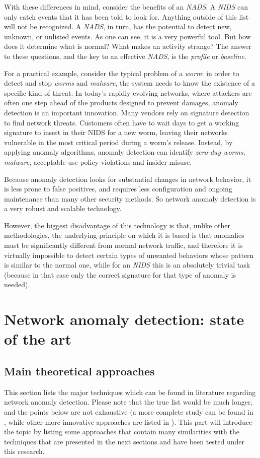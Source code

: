 \documentclass[12pt,a4paper,cucitura]{toptesi}
\begin{document}
With these differences in mind, consider the benefits of an \emph{NADS}.
A \emph{NIDS} can only catch events that it has been told to look for.
Anything outside of this list will not be recognized. A \emph{NADS}, in turn, has the potential to detect new, unknown, or unlisted events.
As one can see, it is a very powerful tool.
But how does it determine what is normal? What makes an activity strange? The answer to these questions, and the key to an effective \emph{NADS}, is the \emph{profile} or \emph{baseline}.

For a practical example, consider the typical problem of a \emph{worm}: in order to detect and stop \emph{worms} and \emph{malware}, the system needs to know the existence of a specific kind of threat.
In today's rapidly evolving networks, where attackers are often one step ahead of the products designed to prevent damages, anomaly detection is an important innovation. 
Many vendors rely on signature detection to find network threats.
Customers often have to wait days to get a working signature to insert in their {NIDS} for a new worm, leaving their networks vulnerable in the most critical period during a worm's release.
Instead, by applying anomaly algorithms, anomaly detection can identify \emph{zero-day worms}, \emph{malware}, acceptable-use policy violations and insider misuse. 

Because anomaly detection looks for substantial changes in network behavior, it is less prone to false positives, and requires less configuration and ongoing maintenance than many other security methods.
So network anomaly detection is a very robust and scalable technology.

However, the biggest disadvantage of this technology is that, unlike other methodologies, the underlying principle on which it is based is that anomalies must be significantly different from normal network traffic, and therefore it is virtually impossible to detect certain types of unwanted behaviors whose pattern is similar to the normal one, while for an \emph{NIDS} this is an absolutely trivial task (because in that case only the correct signature for that type of anomaly is needed).

\chapter{Network anomaly detection: state of the art}
\section {Main theoretical approaches}
This section lists the major techniques which can be found in literature regarding network anomaly detection.
Please note that the true list would be much longer, and the points below are not exhaustive (a more complete study can be found in \cite{survey}, while other more innovative approaches are listed in \cite{newsurvey}).
This part will introduce the topic by listing some approaches that contain many similarities with the techniques that are presented in the next sections and have been tested under this research.
\end{document}
